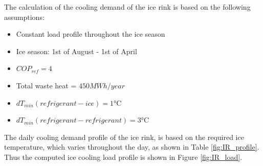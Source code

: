 \documentclass{article}
\begin{document}
The calculation of the cooling demand of the ice rink is based on the following assumptions:
\begin{itemize}
	\item Constant load profile throughout the ice season
	\item Ice season: 1st of August - 1st of April
	\item $COP_{ref} = 4$ \cite{karampourMEASUREMENTMODELLINGICE}
	\item Total waste heat = $ 450 MWh/year$ \cite{kolasniewskiEvaluationModellingIce}
	\item $dT_{min}(refrigerant-ice) = 1 \si{\celsius}$
	\item $dT_{min}(refrigerant-refrigerant) = 3 \si{\celsius}$
\end{itemize}

The daily cooling demand profile of the ice rink, is based on the required ice temperature, which varies throughout the day\cite{karampourMEASUREMENTMODELLINGICE}, as shown in Table \ref{fig:IR_profile}. Thus the computed ice cooling load profile is shown in Figure \ref{fig:IR_load}.
\end{document}
